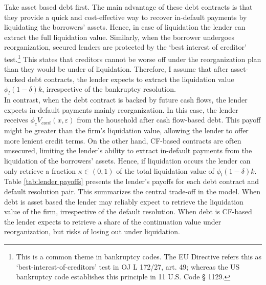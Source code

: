 \documentclass[12pt]{article}
\begin{document}
Take asset based debt first. The main advantage of these debt contracts is that they provide a quick and cost-effective way to recover in-default payments by liquidating the borrowers' assets. Hence, in case of liquidation the lender can extract the full liquidation value. Similarly, when the borrower undergoes reorganization, secured lenders are protected by the `best interest of creditor' test.\footnote{This is a common theme in bankruptcy codes. The EU Directive refers this as ‘best-interest-of-creditors’ test in OJ L 172/27, art. 49; whereas the US bankruptcy code establishes this principle in 11 U.S. Code § 1129.} This states that creditors cannot be worse off under the reorganization plan than they would be under of liquidation. Therefore, I assume that after asset-backed debt contracts, the lender expects to extract the liquidation value $\phi_l(1-\delta)k$, irrespective of the bankruptcy resolution. \vspace{3mm} \\
In contrast, when the debt contract is backed by future cash flows, the lender expects in-default payments mainly reorganization. In this case, the lender receives $\phi_c V_{cont}(x,\varepsilon)$ from the household after cash flow-based debt. This payoff might be greater than the firm's liquidation value, allowing the lender to offer more lenient credit terms. On the other hand, CF-based contracts are often unsecured, limiting the lender's ability to extract in-default payments from the liquidation of the borrowers' assets. Hence, if liquidation occurs the lender can only retrieve a fraction $\kappa \in (0,1)$ of the total liquidation value of $\phi_l(1-\delta)k$.  \vspace{3mm} \\
Table \ref{tab:lender payoffs} presents the lender's payoffs for each debt contract and default resolution pair. This summarizes the central trade-off in the model. When debt is asset based the lender may reliably expect to retrieve the liquidation value of the firm, irrespective of the default resolution. When debt is CF-based the lender expects to retrieve a share of the continuation value under reorganization, but risks of losing out under liquidation.
\end{document}
